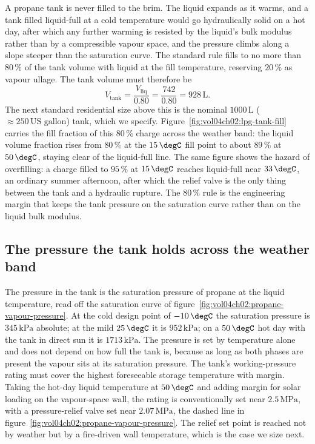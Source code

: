 A propane tank is never filled to the brim. The liquid expands as it
warms, and a tank filled liquid-full at a cold temperature would go
hydraulically solid on a hot day, after which any further warming is
resisted by the liquid's bulk modulus rather than by a compressible
vapour space, and the pressure climbs along a slope steeper than the
saturation curve. The standard rule fills to no more than $80\,\%$ of the
tank volume with liquid at the fill temperature, reserving $20\,\%$ as
vapour ullage. The tank volume must therefore be
\[
V_{\text{tank}} = \frac{V_{\text{liq}}}{0.80} = \frac{742}{0.80} = 928\,
\text{L}.
\]
The next standard residential size above this is the nominal
$1000\,\text{L}$ ($\approx 250\,\text{US gallon}$) tank, which we
specify. Figure~\ref{fig:vol04ch02:lpg-tank-fill} carries the fill
fraction of this $80\,\%$ charge across the weather band: the liquid
volume fraction rises from $80\,\%$ at the $15\,\degC$ fill point to
about $89\,\%$ at $50\,\degC$, staying clear of the liquid-full line.
The same figure shows the hazard of overfilling: a charge filled to
$95\,\%$ at $15\,\degC$ reaches liquid-full near $33\,\degC$, an ordinary
summer afternoon, after which the relief valve is the only thing between
the tank and a hydraulic rupture. The $80\,\%$ rule is the engineering
margin that keeps the tank pressure on the saturation curve rather than
on the liquid bulk modulus.

\subsection{The pressure the tank holds across the weather band}

The pressure in the tank is the saturation pressure of propane at the
liquid temperature, read off the saturation curve of
figure~\ref{fig:vol04ch02:propane-vapour-pressure}. At the cold design
point of $-10\,\degC$ the saturation pressure is $345\,\text{kPa}$
absolute; at the mild $25\,\degC$ it is $952\,\text{kPa}$; on a
$50\,\degC$ hot day with the tank in direct sun it is $1713\,\text{kPa}$.
The pressure is set by temperature alone and does not depend on how full
the tank is, because as long as both phases are present the vapour sits at
its saturation pressure. The tank's working-pressure rating must cover
the highest foreseeable storage temperature with margin. Taking the
hot-day liquid temperature at $50\,\degC$ and adding margin for solar
loading on the vapour-space wall, the rating is conventionally set near
$2.5\,\text{MPa}$, with a pressure-relief valve set near $2.07\,\text{MPa}$,
the dashed line in figure~\ref{fig:vol04ch02:propane-vapour-pressure}.
The relief set point is reached not by weather but by a fire-driven wall
temperature, which is the case we size next.

